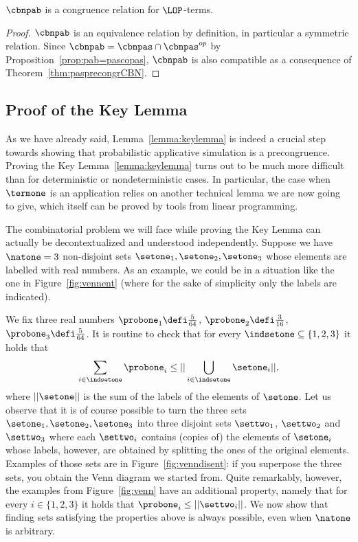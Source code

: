 \begin{corollary}\label{cor:pabcongrCBN}
  $\cbnpab$ is a congruence relation for $\LOP$-terms.
\end{corollary}
\begin{proof}
  $\cbnpab$ is an equivalence relation by definition, in particular a
  symmetric relation. Since $\cbnpab = \cbnpas \cap \cbnpas^{op}$ by
  Proposition~\ref{prop:pab=pascopas}, $\cbnpab$ is also compatible as a
  consequence of Theorem~\ref{thm:pasprecongrCBN}.
\end{proof}

\subsection{Proof of the Key Lemma}
As we have already said, Lemma~\ref{lemma:keylemma} is indeed a crucial step towards showing that probabilistic 
applicative simulation is a precongruence.
Proving the Key Lemma~\ref{lemma:keylemma} turns out to be much more difficult than for deterministic
or nondeterministic cases. In particular, the case when $\termone$ is an application relies on another technical lemma we
are now going to give, which itself can be proved by tools from linear programming.

The combinatorial problem we will face while proving the Key Lemma can actually be decontextualized and
understood independently. Suppose we have $\natone=3$ non-disjoint sets 
$\setone_1,\setone_2,\setone_3$ whose elements are labelled with real numbers.
As an example, we could be in a situation like the one in Figure~\ref{fig:vennent} (where for the
sake of simplicity only the labels are indicated).
\begin{figure*}
  \centering
  \hspace{20mm}
  \caption{Disentangling Sets}\label{fig:venn}
\end{figure*}
\newcommand{\meas}[1]{||#1||} 
We fix three real numbers $\probone_1\defi\frac{5}{64}$, $\probone_2\defi\frac{3}{16}$,
$\probone_3\defi\frac{5}{64}$. It is routine to check that for every
$\indsetone\subseteq\{1,2,3\}$ it holds that
$$
\sum_{i\in\indsetone}\probone_i\leq\meas{\bigcup_{i\in\indsetone}\setone_i},
$$
where $\meas{\setone}$ is  the sum of the labels of the elements of $\setone$.
Let us observe that it is of course possible to turn the three sets $\setone_1,\setone_2,\setone_3$
into three disjoint sets $\settwo_1$, $\settwo_2$ and $\settwo_3$ where
each $\settwo_i$ contains (copies of) the elements of $\setone_i$ whose labels, 
however, are obtained by splitting the ones of the original elements. Examples
of those sets are in Figure~\ref{fig:venndisent}: if you superpose the
three sets, you obtain the Venn diagram we started from. Quite remarkably, however,
the examples from Figure~\ref{fig:venn} have an additional property, namely
that for every $i\in\{1,2,3\}$ it holds that $\probone_i\leq\meas{\settwo_i}$.
We now show that finding sets satisfying the properties above is always possible, 
even when $\natone$ is arbitrary.

